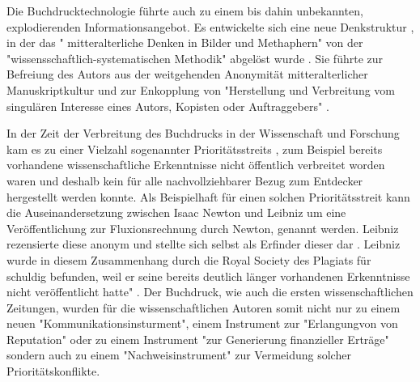 Die Buchdrucktechnologie führte auch zu einem bis dahin unbekannten, explodierenden Informationsangebot. Es entwickelte sich eine neue Denkstruktur \cite{eisenstein_1997_druckerpresse}, in der das " mitteralterliche Denken in Bilder und Methaphern" von der "wissensschaftlich-systematischen Methodik" abgelöst wurde \cite{wunderlich_2008_buchdruck}. Sie führte zur Befreiung des Autors aus der weitgehenden Anonymität mitteralterlicher Manuskriptkultur und zur Enkopplung von "Herstellung und Verbreitung vom singulären Interesse eines Autors, Kopisten oder Auftraggebers"\cite{wunderlich_2008_buchdruck} \cite{schirmbacher_2009_wisspub}. 

In der Zeit der Verbreitung des Buchdrucks in der Wissenschaft und Forschung kam es zu einer Vielzahl sogenannter Prioritätsstreits \cite{schirmbacher_2009_wisspub}, zum Beispiel bereits vorhandene wissenschaftliche Erkenntnisse nicht öffentlich verbreitet worden waren und deshalb kein für alle nachvollziehbarer Bezug zum Entdecker hergestellt werden konnte. Als Beispielhaft für einen solchen Prioritätsstreit kann die Auseinandersetzung zwischen Isaac Newton und Leibniz um eine Veröffentlichung zur Fluxionsrechnung durch Newton, genannt werden. Leibniz rezensierte diese anonym und stellte sich selbst als Erfinder dieser dar \cite{2013_leibniz}. Leibniz wurde in diesem Zusammenhang durch die Royal Society des Plagiats für schuldig befunden, weil er seine bereits deutlich länger vorhandenen Erkenntnisse nicht veröffentlicht hatte" \cite{schirmbacher_2009_wisspub}. Der Buchdruck, wie auch die ersten wissenschaftlichen Zeitungen, wurden für die wissenschaftlichen Autoren somit nicht nur zu einem neuen "Kommunikationsinsturment", einem Instrument zur "Erlangungvon von Reputation" oder zu einem Instrument "zur Generierung finanzieller Erträge" sondern auch zu einem "Nachweisinstrument" \cite{wunderlich_2008_buchdruck} \cite{schirmbacher_2009_wisspub} zur Vermeidung solcher Prioritätskonflikte. 

